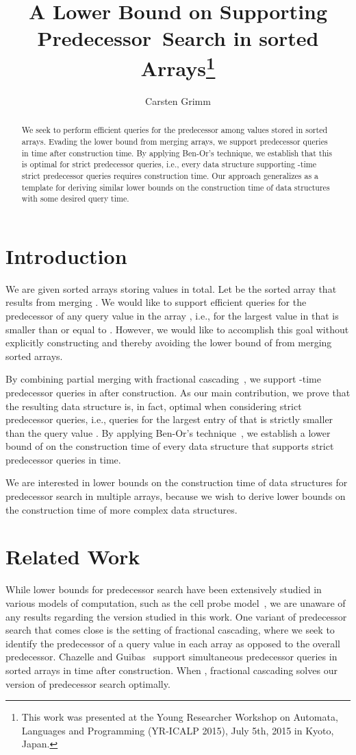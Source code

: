 \documentclass[orivec]{llncs}
\title{A Lower Bound on Supporting Predecessor~Search in  sorted Arrays\thanks{This work was presented at the Young Researcher Workshop on Automata, Languages and Programming (YR-ICALP 2015), July 5th, 2015 in Kyoto, Japan.}}
\author{Carsten Grimm\inst{1}\fnmsep\inst{2}}
\institute{Otto-von-Guericke-Universität Magdeburg, Magdeburg, Germany \and Carleton University, Ottawa, Ontario, Canada}
\begin{document}
\maketitle
 \vspace{-2\baselineskip}
\begin{abstract}
We seek to perform efficient queries for the predecessor among  values stored in  sorted arrays. Evading the  lower bound from merging  arrays, we support predecessor queries in  time after  construction time. By applying Ben-Or's technique, we establish that this is optimal for strict predecessor queries, i.e., every data structure supporting -time strict predecessor queries requires  construction time. Our approach generalizes as a template for deriving similar lower bounds on the construction time of data structures with some desired query time. 
\end{abstract}

\section{Introduction}

We are given  sorted arrays  storing  values in total. Let  be the sorted array that results from merging . We would like to support efficient queries for the predecessor of any query value  in the array , i.e., for the largest value in  that is smaller than or equal to . However, we would like to accomplish this goal without explicitly constructing  and thereby avoiding the lower bound of  from merging  sorted arrays.

By combining partial merging with fractional cascading~\cite{chazelle1986fractional}, we support -time predecessor queries in  after  construction. As our main contribution, we prove that the resulting data structure is, in fact, optimal when considering strict predecessor queries, i.e., queries for the largest entry of  that is strictly smaller than the query value . By applying Ben-Or's technique~\cite{benor1983lower}, we establish a lower bound of  on the construction time of every data structure that supports strict predecessor queries in  time. 

We are interested in lower bounds on the construction time of data structures for predecessor search in multiple arrays, because we wish to derive lower bounds on the construction time of more complex data structures.

\section{Related Work} \label{sec::relatedwork}
While lower bounds for predecessor search have been extensively studied in various models of computation, such as the cell probe model~\cite{sen2008lower}, we are unaware of any results regarding the version studied in this work. One variant of predecessor search that comes close is the setting of fractional cascading, where we seek to identify the predecessor of a query value in each array as opposed to the overall predecessor. Chazelle and Guibas~\cite{chazelle1986fractional} support simultaneous predecessor queries in  sorted arrays in  time after  construction. When , fractional cascading solves our version of predecessor search optimally. 
\end{document}

